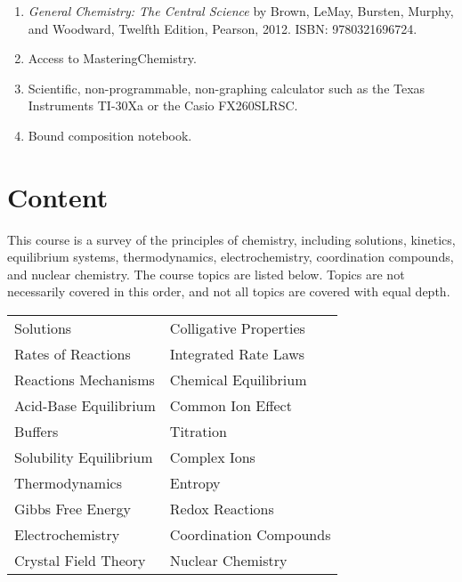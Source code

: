 \documentclass[letterpaper,oneside,onecolumn,11pt,article]{memoir}
\begin{document}
\begin{enumerate}
\item \textit{General Chemistry: The Central Science} by Brown, LeMay, Bursten, Murphy, and Woodward, Twelfth Edition, Pearson, 2012. ISBN: 9780321696724. 

\item Access to MasteringChemistry. 

\item Scientific, non-programmable, non-graphing calculator such as the Texas Instruments TI-30Xa or the  Casio FX260SLRSC.

\item Bound composition notebook. 
\end{enumerate}


\section{Content}

This course is a survey of the principles of chemistry, including solutions, kinetics, equilibrium systems, thermodynamics, electrochemistry, coordination compounds, and nuclear chemistry. The course topics are listed below. Topics are not necessarily covered in this order, and not all topics are covered with equal depth.

\begin{table}[h]
\renewcommand{\arraystretch}{1}
\begin{tabular}{l|l} \toprule
Solutions & Colligative Properties \\
Rates of Reactions & Integrated Rate Laws \\
Reactions Mechanisms &  Chemical Equilibrium \\
Acid-Base Equilibrium &  Common Ion Effect \\
Buffers & Titration \\
Solubility Equilibrium & Complex Ions \\
Thermodynamics & Entropy \\
Gibbs Free Energy & Redox Reactions \\
Electrochemistry & Coordination Compounds \\
Crystal Field Theory & Nuclear Chemistry \\
\bottomrule
\end{tabular}
\end{table}
\end{document}
